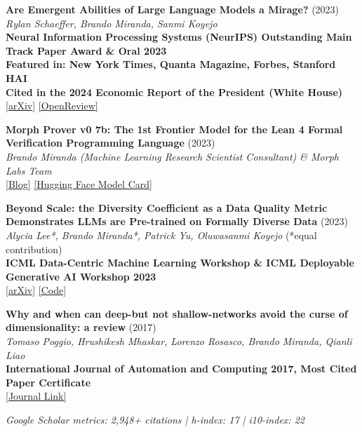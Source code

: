 \documentclass{article}
\newenvironment{changemargin}[2]{%
  \begin{list}{}{%
    \setlength{\topsep}{0pt}%
    \setlength{\leftmargin}{#1}%
    \setlength{\rightmargin}{#2}%
    \setlength{\listparindent}{\parindent}%
    \setlength{\itemindent}{\parindent}%
    \setlength{\parsep}{\parskip}%
  }%
  \item[]}{\end{list}
}
\newenvironment{body} {
	\vspace*{-16pt}
	\begin{changemargin}{-0.25in}{-0.5in}
  }	
	{\end{changemargin}
}
\begin{document}
\begin{body}
    \vspace{10pt}
    \textbf{Are Emergent Abilities of Large Language Models a Mirage?} (2023)\\
    \emph{Rylan Schaeffer, Brando Miranda, Sanmi Koyejo}\\
    \textbf{Neural Information Processing Systems (NeurIPS) Outstanding Main Track Paper Award \& Oral 2023}\\
    \textbf{Featured in: New York Times, Quanta Magazine, Forbes, Stanford HAI}\\
    \textbf{Cited in the 2024 Economic Report of the President (White House)}\\
    \href{https://arxiv.org/abs/2304.15004}{[arXiv]} \href{https://openreview.net/forum?id=ITw9edRDlD}{[OpenReview]}
    
    \vspace{10pt}
    \textbf{Morph Prover v0 7b: The 1st Frontier Model for the Lean 4 Formal Verification Programming Language} (2023)\\
    \emph{Brando Miranda (Machine Learning Research Scientist Consultant) \& Morph Labs Team}\\
    \href{https://morph.so/blog/the-personal-ai-proof-engineer/}{[Blog]} \href{https://huggingface.co/morph-labs/morph-prover-v0-7b}{[Hugging Face Model Card]}
    
    \vspace{10pt}
    \textbf{Beyond Scale: the Diversity Coefficient as a Data Quality Metric Demonstrates LLMs are Pre-trained on Formally Diverse Data} (2023)\\
    \emph{Alycia Lee*, Brando Miranda*, Patrick Yu, Oluwasanmi Koyejo} (*equal contribution)\\
    \textbf{ICML Data-Centric Machine Learning Workshop \& ICML Deployable Generative AI Workshop 2023}\\
    \href{https://arxiv.org/abs/2306.13840}{[arXiv]} \href{https://github.com/alycialee/beyond-scale-language-data-diversity}{[Code]}
    
    \vspace{10pt}
    \textbf{Why and when can deep-but not shallow-networks avoid the curse of dimensionality: a review} (2017)\\
    \emph{Tomaso Poggio, Hrushikesh Mhaskar, Lorenzo Rosasco, Brando Miranda, Qianli Liao}\\
    \textbf{International Journal of Automation and Computing 2017, Most Cited Paper Certificate}\\
    \href{https://link.springer.com/article/10.1007/s11633-017-1054-2}{[Journal Link]}
    
    \vspace{8pt}
    \emph{Google Scholar metrics: 2,948+ citations | h-index: 17 | i10-index: 22}
\end{body}
\end{document}
